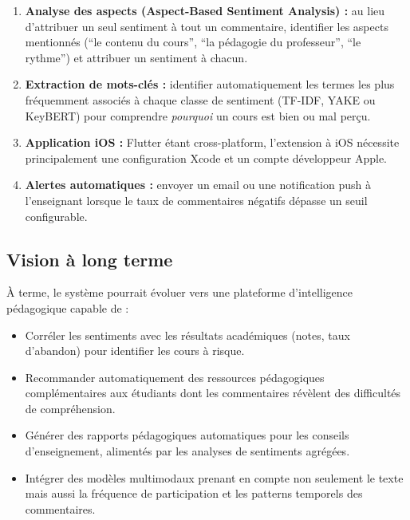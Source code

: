 \begin{enumerate}
  \item \textbf{Analyse des aspects (Aspect-Based Sentiment Analysis) :}
        au lieu d'attribuer un seul sentiment à tout un commentaire,
        identifier les aspects mentionnés (``le contenu du cours'',
        ``la pédagogie du professeur'', ``le rythme'') et attribuer
        un sentiment à chacun.

  \item \textbf{Extraction de mots-clés :} identifier automatiquement
        les termes les plus fréquemment associés à chaque classe de sentiment
        (TF-IDF, YAKE ou KeyBERT) pour comprendre \textit{pourquoi} un
        cours est bien ou mal perçu.

  \item \textbf{Application iOS :} Flutter étant cross-platform, l'extension
        à iOS nécessite principalement une configuration Xcode et un compte
        développeur Apple.

  \item \textbf{Alertes automatiques :} envoyer un email ou une notification
        push à l'enseignant lorsque le taux de commentaires négatifs dépasse
        un seuil configurable.
\end{enumerate}

\subsection{Vision à long terme}

\begin{definitionbox}
À terme, le système pourrait évoluer vers une plateforme d'intelligence
pédagogique capable de :
\begin{itemize}
  \item Corréler les sentiments avec les résultats académiques (notes,
        taux d'abandon) pour identifier les cours à risque.
  \item Recommander automatiquement des ressources pédagogiques
        complémentaires aux étudiants dont les commentaires révèlent des
        difficultés de compréhension.
  \item Générer des rapports pédagogiques automatiques pour les conseils
        d'enseignement, alimentés par les analyses de sentiments agrégées.
  \item Intégrer des modèles multimodaux prenant en compte non seulement
        le texte mais aussi la fréquence de participation et les patterns
        temporels des commentaires.
\end{itemize}
\end{definitionbox}

